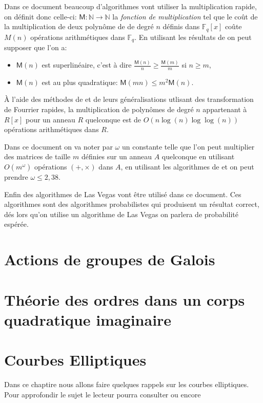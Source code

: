 \documentclass[10pt,a4paper]{book}
\theoremstyle{plain}
\theoremstyle{definition}
\theoremstyle{definition}
\theoremstyle{definition}
\theoremstyle{definition}
\theoremstyle{remark}
\theoremstyle{remark}
\theoremstyle{definition}
\begin{document}
Dans ce document beaucoup d'algorithmes vont utiliser la multiplication rapide, on définit donc celle-ci: $\mathsf{M}:\mathbb{N} \rightarrow \mathbb{N}$ la \emph{fonction de multiplication} tel que le coût de la multiplication de deux polynôme de de degré $n$ définis dans $\mathbb{F}_q[x]$ coûte $M(n)$ opérations arithmétiques dans $\mathbb{F}_q$. En utilisant les résultats de \cite[§8.3]{vzGJG03}  on peut supposer que l'on a:
\begin{itemize}
\item $\mathsf{M}(n)$ est superlinéaire, c'est à dire $\frac{\mathsf{M}(n)}{n} \geqslant \frac{\mathsf{M}(m)}{m}$ si $n \geqslant m$,
\item $\mathsf{M}(n)$ est au plus quadratique: $\mathsf{M}(mn) \leqslant m^2 \mathsf{M}(n)$.
\end{itemize} 

\`A l'aide des méthodes de \cite{SchonhageStrassen71} et de leurs généralisations  \cite{Schonhage77} \cite{Cantor-Kaltofen91} utlisant des transformation de Fourrier rapides, la multiplication de polynômes de degré $n$ appartenant à $R[x]$ pour un anneau $R$ quelconque est de $O(n\log(n) \log \log (n))$ opérations arithmétiques dans $R$.

Dans ce document on va noter par $\omega$ un constante telle que l'on peut 
multiplier des matrices de taille $m$ définies sur un anneau $A$ quelconque en
utilisant $O(m^{\omega})$ opérations $(+,\times)$ dans $A$, en utilisant les 
algorithmes de \cite{CoppersmithWinograd90} et \cite{Williams12} on peut 
prendre $\omega \leqslant 2,38$.

Enfin des algorithmes de Las Vegas vont être utilisé dans ce document. Ces algorithmes sont des algorithmes probabilistes qui produisent un résultat correct, dés lors qu'on utilise un algorithme de Las Vegas on parlera de probabilité espérée.

\section{Actions de groupes de Galois}


\section{Théorie des ordres dans un corps quadratique imaginaire}

\section{Courbes Elliptiques}
Dans ce chaptire nous allons faire quelques rappels sur les courbes elliptiques. Pour approfondir le sujet le lecteur pourra consulter \cite{Silv1} ou encore \cite{Washington2008}
\end{document}
